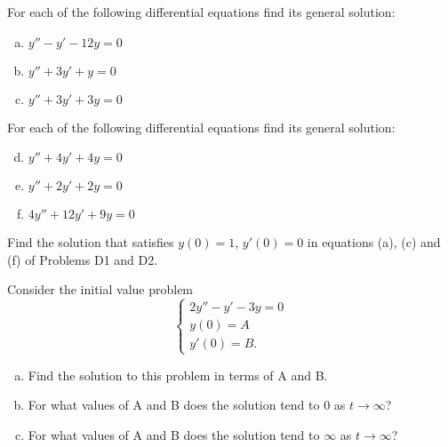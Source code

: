 \documentclass[12pt,letterpaper]{hmcpset}
\begin{document}

\begin{problem}[D1]
    For each of the following differential
    equations find its general solution:    
    \begin{enumerate}[(a)]
        \item $y'' - y' - 12y = 0$
        \item $y'' + 3y' + y = 0$
        \item $y'' + 3y' + 3y = 0$
    \end{enumerate}
\end{problem}

\begin{solution}
\end{solution}
\clearpage

\begin{problem}[D2]
    For each of the following differential
    equations find its general solution:    
    \begin{enumerate}[(a)]
        \setcounter{enumi}{3}
        \item $y'' + 4y' + 4y = 0$
        \item $y'' + 2y' + 2y = 0$
        \item $4y'' + 12y' + 9y = 0$
    \end{enumerate}
\end{problem}

\begin{solution}
\end{solution}
\clearpage

\begin{problem}[D3]
    Find the solution that satisfies $y(0) = 1$, $y'(0)
    = 0$ in equations (a), (c) and (f) of Problems
    D1 and D2.
\end{problem}

\begin{solution}
    \vfill
\end{solution}
\clearpage

\begin{problem}[D4]
    Consider the initial value problem
    \[
        \begin{cases}
            2y'' - y' - 3y = 0\\
            y(0) = A\\
            y'(0) = B.
        \end{cases}
    \]
    \begin{enumerate}[(a)]
        \item  Find the solution to this problem
            in terms of A and B.
        \item For what values of A and B does the
            solution tend to 0 as $t\to\infty$?
        \item For what values of A and B does the
            solution tend to $\infty$ as $t\to\infty$?
    \end{enumerate}
\end{problem}
\end{document}
